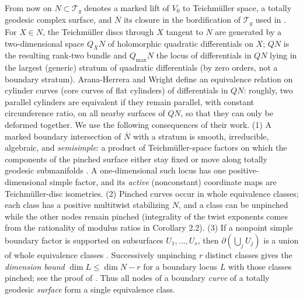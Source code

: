 \documentclass[12pt]{article}
\newcommand{\T}{\mathcal T}
\newcommand{\cl}[1]{\overline{#1}}
\theoremstyle{remark}
\begin{document}
From now on \(N\subset\T_g\) denotes a marked lift of \(V_0\) to
Teichm\"uller space, a totally geodesic complex surface, and
\(\cl N\) its closure in the bordification of \(\T_g\) used in
\cite{AHW}. For
\(X\in N\), the Teichm\"uller discs through \(X\) tangent to \(N\)
are generated by a two-dimensional space \(Q_XN\) of holomorphic
quadratic differentials on \(X\); \(QN\) is the resulting rank-two
bundle and \(Q_{\max}N\) the locus of differentials in \(QN\) lying
in the largest (generic) stratum of quadratic differentials (by
zero orders, not a boundary stratum). Arana-Herrera and Wright
\cite{AHW} define an equivalence relation on cylinder curves (core
curves of flat cylinders) of
differentials in \(QN\): roughly, two parallel cylinders are
equivalent if they remain parallel, with constant circumference
ratio, on all nearby surfaces of \(QN\), so that they can only be
deformed together. We use the following consequences of their work.
(1) A marked boundary intersection of \(\cl N\) with a stratum is
smooth, irreducible, algebraic, and \emph{semisimple}: a product of
Teichm\"uller-space factors on which the components of the pinched
surface either stay fixed or move along totally geodesic
submanifolds \cite[Theorem 1.3]{AHW}. A one-dimensional such locus
has one positive-dimensional simple factor, and its \emph{active}
(nonconstant) coordinate maps are Teichm\"uller-disc isometries.
(2) Pinched curves occur in whole equivalence classes; each
class has a positive multitwist stabilizing \(N\), and a class can
be unpinched while the other nodes remain pinched
\cite[Corollary 2.2, Lemmas 2.6 and 2.13, Corollaries 2.12 and
3.17]{AHW} (integrality of the twist exponents comes from the
rationality of modulus ratios in Corollary 2.2).
(3) If a nonpoint simple boundary factor is supported on
subsurfaces \(U_1,\ldots,U_s\), then
\(\partial(\bigcup_j U_j)\) is a union of whole equivalence classes
\cite[Lemma 6.1(3)]{AHW}.
Successively unpinching \(r\) distinct
classes gives the \emph{dimension bound} \(\dim L\leq\dim N-r\) for
a boundary locus \(L\) with those classes pinched; see the proof of
\cite[Theorem 3.9]{AHW}. Thus all nodes of a boundary \emph{curve}
of a totally geodesic \emph{surface} form a single equivalence class.
\end{document}
